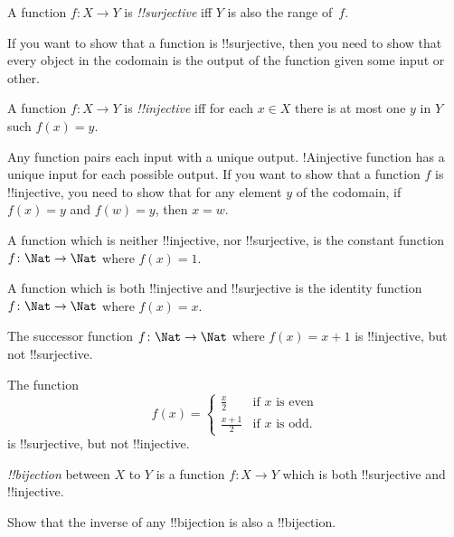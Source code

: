 \documentclass[../../include/open-logic-section]{subfiles}
\begin{document}

\begin{defn}
A function $f \colon X \rightarrow Y$ is \emph{!!{surjective}} iff $Y$ is also
the range of~$f$.
\end{defn}

\begin{explain}
If you want to show that a function is !!{surjective}, then you need
to show that every object in the codomain is the output of the
function given some input or other.
\end{explain}

\begin{defn}
A function $f \colon X \rightarrow Y$ is \emph{!!{injective}} iff for
each $x \in X$ there is at most one $y$ in $Y$ such $f(x) = y$.
\end{defn}

\begin{explain}
Any function pairs each input with a unique output. !A{injective} function has a unique input for each possible output. If you want to show that a function $f$ is !!{injective}, you need to show that for any element $y$ of the codomain, if $f(x)=y$ and $f(w)=y$, then $x=w$.

A function which is neither !!{injective}, nor !!{surjective}, is the constant function $f\colon \Nat \rightarrow \Nat$ where $f(x) = 1$.
    
A function which is both !!{injective} and !!{surjective} is the identity function $f\colon \Nat \rightarrow \Nat$ where $f(x) = x$.

The successor function $f \colon \Nat \rightarrow \Nat$ where $f(x) = x+1$ is !!{injective}, but not !!{surjective}.

The function 
\[
f(x) = 
\begin{cases}
  \frac{x}{2} & \text{if $x$ is even} \\
  \frac{x+1}{2} & \text{if $x$ is odd.}
\end{cases}
\]
is !!{surjective}, but not !!{injective}.

\end{explain}

\begin{defn}
 \emph{!!{bijection}} between $X$ to $Y$ is a
function $f \colon X \rightarrow Y$ which is both !!{surjective} and
!!{injective}.
\end{defn}

\begin{prob}
Show that the inverse of any !!{bijection} is also a !!{bijection}.
\end{prob}
\end{document}
